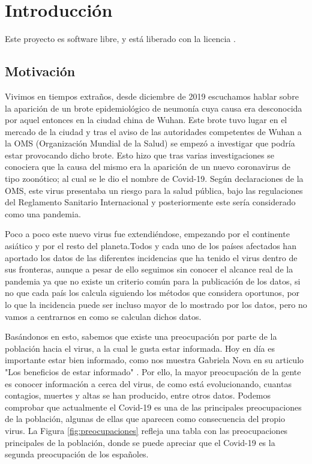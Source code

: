 \chapter{Introducción} \label{ch:introduccion}

Este proyecto es software libre, y está liberado con la licencia \cite{agplv3}.

\section{Motivación}

Vivimos en tiempos extraños, desde diciembre de 2019 escuchamos hablar sobre la aparición de un brote epidemiológico de neumonía cuya causa era desconocida por aquel entonces en la ciudad china de Wuhan. Este brote tuvo lugar en el mercado de la ciudad y tras el aviso de las autoridades competentes de Wuhan a la OMS (Organización Mundial de la Salud) se empezó a investigar que podría estar provocando dicho brote. Esto hizo que tras varias investigaciones se conociera que la causa del mismo era la aparición de un nuevo coronavirus \cite{oms-covid} de tipo zoonótico; al cual se le dio el nombre de Covid-19. Según declaraciones de la OMS, este virus presentaba un riesgo para la salud pública, bajo las regulaciones del Reglamento Sanitario Internacional \cite{reglamento-sanitario-internacional} y posteriormente este sería considerado como una pandemia.

Poco a poco este nuevo virus fue extendiéndose, empezando por el continente asiático y por el resto del planeta.Todos y cada uno de los países afectados han aportado los datos de las diferentes incidencias que ha tenido el virus dentro de sus fronteras, aunque a pesar de ello seguimos sin conocer el alcance real de la pandemia ya que no existe un criterio común para la publicación de los datos, si no que cada país los calcula siguiendo los métodos que considera oportunos, por lo que la incidencia puede ser incluso mayor de lo mostrado por los datos, pero no vamos a centrarnos en como se calculan dichos datos.

Basándonos en esto, sabemos que existe una preocupación por parte de la población hacia el virus, a la cual le gusta estar informada. Hoy en día es importante estar bien informado, como nos muestra Gabriela Nova en su articulo "Los beneficios de estar informado" \cite{gabriela-nova}. Por ello, la mayor preocupación de la gente es conocer información a cerca del virus, de como está evolucionando, cuantas contagios, muertes y altas se han producido, entre otros datos. Podemos comprobar que actualmente el Covid-19 es una de las principales preocupaciones de la población, algunas de ellas que aparecen como consecuencia del propio virus. La Figura \ref{fig:preocupaciones} refleja una tabla con las preocupaciones principales de la población, donde se puede apreciar que el Covid-19 es la segunda preocupación de los españoles.

